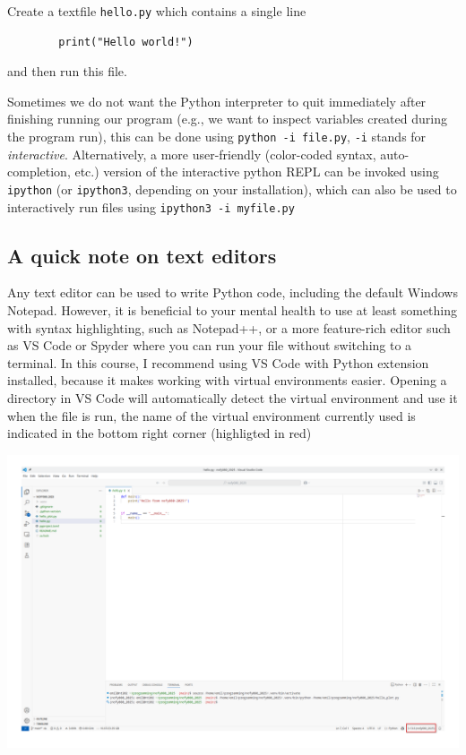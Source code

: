\begin{exercise}
    Create a textfile \verb|hello.py| which contains a single line
    \begin{lstlisting}
        print("Hello world!")
    \end{lstlisting}
    and then run this file.
\end{exercise}

Sometimes we do not want the Python interpreter to quit immediately after finishing running our program (e.g., we want to inspect variables created during the program run), this can be done using \verb|python -i file.py|, \verb|-i| stands for \emph{interactive}. Alternatively, a more user-friendly (color-coded syntax, auto-completion, etc.) version of the interactive python REPL can be invoked using \verb|ipython| (or \verb|ipython3|, depending on your installation), which can also be used to interactively run files using \verb|ipython3 -i myfile.py|

\subsection{A quick note on text editors}
Any text editor can be used to write Python code, including the default Windows Notepad. However, it is beneficial to your mental health to use at least something with syntax highlighting, such as Notepad++, or a more feature-rich editor such as VS Code or Spyder where you can run your file without switching to a terminal. In this course, I recommend using VS Code with Python extension installed, because it makes working with virtual environments easier. Opening a directory in VS Code will automatically detect the virtual environment and use it when the file is run, the name of the virtual environment currently used is indicated in the bottom right corner (highligted in red)
\begin{center}
    \includegraphics[width=0.9\linewidth]{vscode.png}
\end{center}

